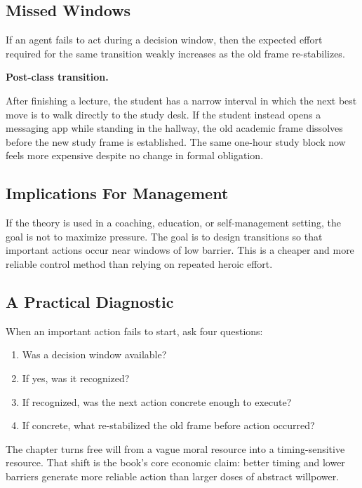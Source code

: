 \subsection{Missed Windows}

\begin{proposition}
If an agent fails to act during a decision window, then the expected effort
required for the same transition weakly increases as the old frame re-stabilizes.
\end{proposition}

\begin{examplebox}
\textbf{Post-class transition.}

After finishing a lecture, the student has a narrow interval in which the next
best move is to walk directly to the study desk. If the student instead opens a
messaging app while standing in the hallway, the old academic frame dissolves
before the new study frame is established. The same one-hour study block now
feels more expensive despite no change in formal obligation.
\end{examplebox}

\subsection{Implications For Management}

If the theory is used in a coaching, education, or self-management setting, the
goal is not to maximize pressure. The goal is to design transitions so that
important actions occur near windows of low barrier. This is a cheaper and more
reliable control method than relying on repeated heroic effort.

\subsection{A Practical Diagnostic}

\begin{methodbox}[title={Window Diagnostic}]
When an important action fails to start, ask four questions:
\begin{enumerate}[nosep]
  \item Was a decision window available?
  \item If yes, was it recognized?
  \item If recognized, was the next action concrete enough to execute?
  \item If concrete, what re-stabilized the old frame before action occurred?
\end{enumerate}
\end{methodbox}

\begin{summarybox}
The chapter turns free will from a vague moral resource into a timing-sensitive
resource. That shift is the book's core economic claim: better timing and lower
barriers generate more reliable action than larger doses of abstract willpower.
\end{summarybox}

